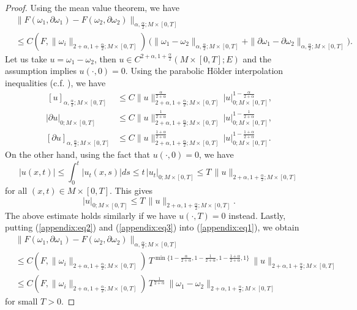 \documentclass{amsart}
\theoremstyle{definition}
\theoremstyle{remark}
\numberwithin{equation}{section}
\begin{document}
\begin{proof}
	Using the mean value theorem, we have
	\begin{equation}\label{appendix:eq1}
		\begin{aligned}
		&\|F(\omega_1,\partial\omega_1) - F(\omega_2,\partial\omega_2)\|_{\alpha,\frac{\alpha}{2};M\times[0,T]} \\
		&\leq C(F,  \|\omega_i\|_{2+\alpha, 1+\frac{\alpha}{2}; M\times [0,T]})\, \Big( \|\omega_1-\omega_2\|_{\alpha,\frac{\alpha}{2};M\times[0,T]} + \|\partial\omega_1- \partial \omega_2\|_{\alpha,\frac{\alpha}{2};M\times[0,T]} \Big).
		\end{aligned}
	\end{equation}
	Let us take $u = \omega_1 - \omega_2$, then $u\in C^{2+\alpha, 1+\frac{\alpha}{2}}(M\times [0,T];E)$ and the assumption implies $u(\cdot,0) = 0$. Using the parabolic H\"older interpolation inequalities (c.f. \cite[Chapter 8.8]{Krylov1996}), we have 
	\begin{equation}\label{appendix:eq2}
		\begin{aligned}
			 \,[u]_{\alpha,\frac{\alpha}{2};M\times[0,T]}  &\leq C \|u\|_{2+\alpha, 1+\frac{\alpha}{2}; M\times [0,T]}^{\frac{\alpha}{2+\alpha}}\, |u|_{0; M\times [0,T]}^{1-\frac{\alpha}{2+\alpha}},\\[1ex]
			|\partial u|_{0; M\times [0,T]}  &\leq C \|u\|_{2+\alpha, 1+\frac{\alpha}{2}; M\times [0,T]}^{\frac{1}{2+\alpha}}\, |u|_{0; M\times [0,T]}^{1-\frac{1}{2+\alpha}},\\[1ex]
			[\partial u]_{\alpha,\frac{\alpha}{2};M\times[0,T]}  &\leq C \|u\|_{2+\alpha, 1+\frac{\alpha}{2}; M\times [0,T]}^{\frac{1+\alpha}{2+\alpha}}\, |u|_{0; M\times [0,T]}^{1-\frac{1+\alpha}{2+\alpha}}.
		\end{aligned}
	\end{equation}
	On the other hand, using the fact that $u(\cdot,0) = 0$, we have
	\[	|u(x,t)| \leq \int_0^t |u_t(x,s)| ds \leq t\, |u_t|_{0;M\times[0,T]}\leq T\,\|u\|_{2+\alpha, 1+\frac{\alpha}{2}; M\times [0,T]} \]
	for all $(x,t)\in M\times [0,T]$. This gives
	\begin{equation}\label{appendix:eq3}
		|u|_{0; M\times [0,T]} \leq T\,\|u\|_{2+\alpha, 1+\frac{\alpha}{2}; M\times [0,T]}.
	\end{equation}
	The above estimate holds similarly if we have $u(\cdot,T) = 0$ instead. Lastly, putting (\ref{appendix:eq2}) and   (\ref{appendix:eq3}) into (\ref{appendix:eq1}), we obtain 
	\begin{align*}
		&\|F(\omega_1,\partial\omega_1) - F(\omega_2,\partial\omega_2)\|_{\alpha,\frac{\alpha}{2};M\times[0,T]}\\[1ex]
		 &\leq  C(F,  \|\omega_i\|_{2+\alpha, 1+\frac{\alpha}{2}; M\times [0,T]})\, T^{\min\{1-\frac{\alpha}{2+\alpha}, 1-\frac{1}{2+\alpha}, 1-\frac{1+\alpha}{2+\alpha}, 1 \}}\, \|u\|_{2+\alpha, 1+\frac{\alpha}{2}; M\times [0,T]}\\[1ex]
		&\leq C(F,  \|\omega_i\|_{2+\alpha, 1+\frac{\alpha}{2}; M\times [0,T]})\, T^{\frac{1}{2+\alpha}}\, \|\omega_1-\omega_2\|_{2+\alpha, 1+\frac{\alpha}{2}; M\times [0,T]}
	\end{align*}
	for small $T>0$.
\end{proof}



\end{document}
